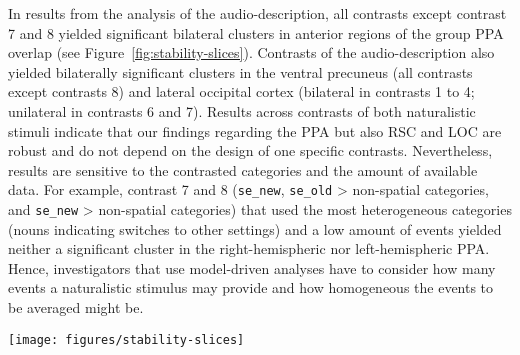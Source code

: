 \documentclass[english,11pt]{article}
\begin{document}

In results from the analysis of the audio-description, all contrasts except
contrast 7 and 8  yielded significant bilateral clusters in anterior regions of
the group PPA overlap (see Figure~\ref{fig:stability-slices}).
Contrasts of the audio-description also yielded bilaterally significant clusters
in the ventral precuneus (all contrasts except contrasts 8) and lateral
occipital cortex (bilateral in contrasts 1 to 4; unilateral in contrasts 6 and
7).
Results across contrasts of both naturalistic stimuli indicate that our findings
regarding the PPA but also RSC and LOC are robust and do not depend on the
design of one specific contrasts.
Nevertheless, results are sensitive to the contrasted categories and the amount
of available data.
For example, contrast 7 and 8 (\texttt{se\_new}, \texttt{se\_old} > non-spatial
categories, and \texttt{se\_new} > non-spatial categories) that used the most
heterogeneous categories (nouns indicating switches to other settings) and a low
amount of events yielded neither a significant cluster in the right-hemispheric
nor left-hemispheric PPA.
Hence, investigators that use model-driven analyses have to consider how many
events a naturalistic stimulus may provide and how homogeneous the events to be
averaged might be.


\begin{figure*}[tbp]
\centering
    \texttt{[image: figures/stability-slices]}
    \caption[NAME]
    {Overlap of significant clusters ($Z$>3.4; $p$<.05, cluster
    corrected) across all contrasts for both naturalistic stimuli.
    The audio-description's contrasts 1-8 (blue)
    are overlaid over the audio-visual movie's contrasts 1-5 (red;
    see Table~\ref{tab:contrasts}).
    Cluster are overlaid on top of the MNI152 T1-weighted head template
    with the acquisition field-of-view for the audio-description study
    highlighted.
    Black: outline of the union of individual PPA ROIs reported by
        \citet{sengupta2016extension}.
    }
    \label{fig:stability-slices}
\end{figure*}
\end{document}
